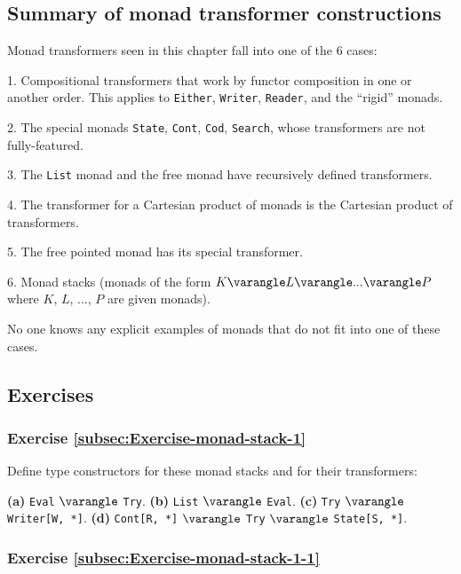 \subsection{Summary of monad transformer constructions}

Monad transformers seen in this chapter fall into one of the 6 cases:

1. Compositional transformers that work by functor composition in
one or another order. This applies to \lstinline!Either!, \lstinline!Writer!,
\lstinline!Reader!, and the \textsf{``}rigid\textsf{''} monads.

2. The special monads \lstinline!State!, \lstinline!Cont!, \lstinline!Cod!,
\lstinline!Search!, whose transformers are not fully-featured.

3. The \lstinline!List! monad and the free monad have recursively
defined transformers.

4. The transformer for a Cartesian product of monads is the Cartesian
product of transformers.

5. The free pointed monad has its special transformer.

6. Monad stacks (monads of the form $K\varangle L\varangle...\varangle P$
where $K$, $L$, ..., $P$ are given monads).

No one knows any explicit examples of monads that do not fit into
one of these cases.

\subsection{Exercises}

\subsubsection{Exercise \label{subsec:Exercise-monad-stack-1}\ref{subsec:Exercise-monad-stack-1}}

Define type constructors for these monad stacks and for their transformers:

\textbf{(a)} \lstinline!Eval! $\varangle$ \lstinline!Try!.\textbf{
(b)} \lstinline!List! $\varangle$ \lstinline!Eval!.\textbf{ (c)}
\lstinline!Try! $\varangle$ \lstinline!Writer[W, *]!.\textbf{ (d)}
\lstinline!Cont[R, *]! $\varangle$ \lstinline!Try! $\varangle$
\lstinline!State[S, *]!.

\subsubsection{Exercise \label{subsec:Exercise-monad-stack-1-1}\ref{subsec:Exercise-monad-stack-1-1}}

